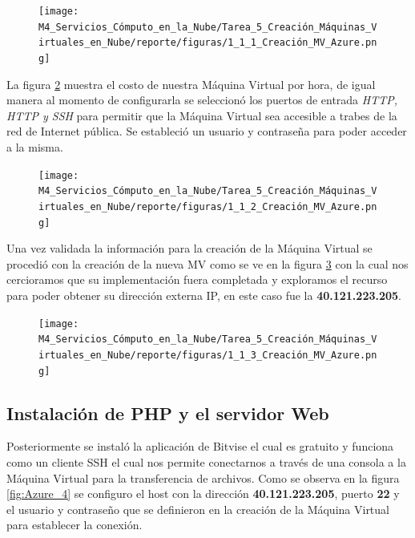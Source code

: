 \documentclass[12pt,a4paper]{article}
\begin{document}
\begin{figure}[H]
    \centering
    \texttt{[image: M4\_Servicios\_Cómputo\_en\_la\_Nube/Tarea\_5\_Creación\_Máquinas\_Virtuales\_en\_Nube/reporte/figuras/1\_1\_1\_Creación\_MV\_Azure.png]}
    \label{fig:Azure_1}
\end{figure}

La figura \ref{fig:Azure_2} muestra el costo de nuestra Máquina Virtual por hora, de igual manera al momento de configurarla se seleccionó los puertos de entrada \textit{HTTP, HTTP y SSH} para permitir que la Máquina Virtual sea accesible a trabes de la red de Internet pública. Se estableció un usuario y contraseña para poder acceder a la misma.

\begin{figure}[H]
    \centering
    \texttt{[image: M4\_Servicios\_Cómputo\_en\_la\_Nube/Tarea\_5\_Creación\_Máquinas\_Virtuales\_en\_Nube/reporte/figuras/1\_1\_2\_Creación\_MV\_Azure.png]}
    \label{fig:Azure_2}
\end{figure}

\vspace{1em}

Una vez validada la información para la creación de la Máquina Virtual se procedió con la creación de la nueva MV como se ve en la figura \ref{fig:Azure_3} con la cual nos cercioramos que su implementación fuera completada y exploramos el recurso para poder obtener su dirección externa IP, en este caso fue la \textbf{40.121.223.205}.

\begin{figure}[H]
    \centering
    \texttt{[image: M4\_Servicios\_Cómputo\_en\_la\_Nube/Tarea\_5\_Creación\_Máquinas\_Virtuales\_en\_Nube/reporte/figuras/1\_1\_3\_Creación\_MV\_Azure.png]}
    \label{fig:Azure_3}
\end{figure}

\subsection{Instalación de PHP y el servidor Web}

Posteriormente se instaló la aplicación de Bitvise el cual es gratuito y funciona como un cliente SSH el cual nos permite conectarnos a través de una consola a la Máquina Virtual para la transferencia de archivos. Como se observa en la figura \ref{fig:Azure_4} se configuro el host con la dirección \textbf{40.121.223.205}, puerto \textbf{22} y el usuario y contraseño que se definieron en la creación de la Máquina Virtual para establecer la conexión.
\end{document}
